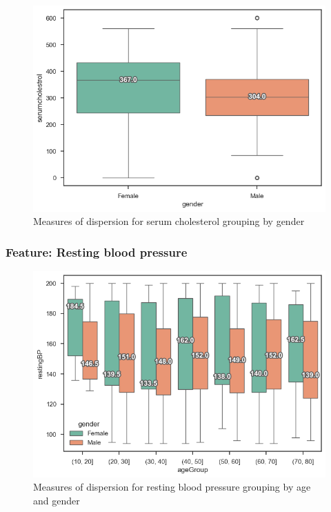 \begin{figure}
    \caption{Measures of dispersion for serum cholesterol grouping by gender}\label{boxplot-cholesterol-gender}
    \centering
    \includegraphics[width=\linewidth]{media/boxplot-06-gender-cholesterol.png}
\end{figure}

\subsubsection{Feature: Resting blood pressure}

\begin{figure}
    \caption{Measures of dispersion for resting blood pressure grouping by age and gender}\label{boxplot-bp-age}
    \centering
    \includegraphics[width=\linewidth]{media/boxplot-07-agegroup-gender-bp.png}
\end{figure}

